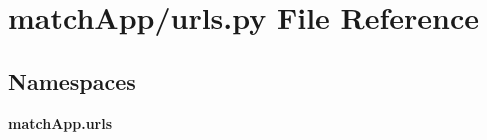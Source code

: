 \section{match\+App/urls.py File Reference}
\label{match_app_2urls_8py}
\subsection*{Namespaces}
\begin{DoxyCompactItemize}
\item 
 {\bf match\+App.\+urls}
\end{DoxyCompactItemize}

